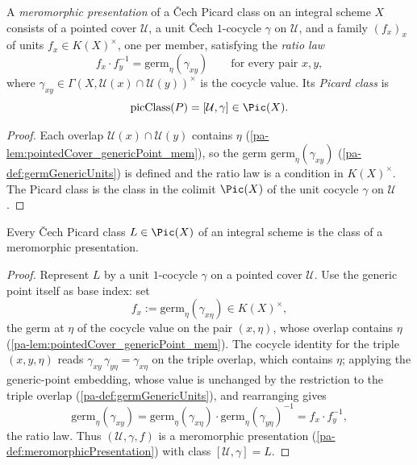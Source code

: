 \begin{definition}
  \label{pa-def:meromorphicPresentation}
  \leanok

  A \emph{meromorphic presentation} of a \v Cech Picard class on an integral scheme \(X\) consists
  of a pointed cover \(\mathcal U\), a unit \v Cech \(1\)-cocycle \(\gamma\) on \(\mathcal U\), and
  a family \((f_x)_x\) of units \(f_x \in K(X)^{\times}\), one per member, satisfying the
  \emph{ratio law}
  \[
    f_x \cdot f_y^{-1} = \mathrm{germ}_\eta(\gamma_{xy}) \qquad \text{for every pair } x, y,
  \]
  where \(\gamma_{xy} \in \Gamma(X, \mathcal U(x) \cap \mathcal U(y))^{\times}\) is the cocycle
  value. Its \emph{Picard class} is
  \[
    \mathrm{picClass}(P) = [\mathcal U, \gamma] \in \Pic(X).
  \]
\end{definition}
\begin{proof}
  \leanok
  Each overlap \(\mathcal U(x) \cap \mathcal U(y)\) contains \(\eta\)
  (\ref{pa-lem:pointedCover_genericPoint_mem}), so the germ \(\mathrm{germ}_\eta(\gamma_{xy})\)
  (\ref{pa-def:germGenericUnits}) is defined and the ratio law is a condition in \(K(X)^{\times}\).
  The Picard class is the class in the colimit \(\Pic(X)\) of the unit cocycle \(\gamma\) on
  \(\mathcal U\).
\end{proof}

\begin{theorem}
  \label{pa-thm:exists_meromorphicPresentation}
  \leanok

  Every \v Cech Picard class \(L \in \Pic(X)\) of an integral scheme is the class of a meromorphic
  presentation.
\end{theorem}
\begin{proof}
  \leanok
  Represent \(L\) by a unit \(1\)-cocycle \(\gamma\) on a pointed cover \(\mathcal U\). Use the
  generic point itself as base index: set
  \[
    f_x := \mathrm{germ}_\eta(\gamma_{x\eta}) \in K(X)^{\times},
  \]
  the germ at \(\eta\) of the cocycle value on the pair \((x, \eta)\), whose overlap contains
  \(\eta\) (\ref{pa-lem:pointedCover_genericPoint_mem}). The cocycle identity for the triple
  \((x, y, \eta)\) reads \(\gamma_{xy}\, \gamma_{y\eta} = \gamma_{x\eta}\) on the triple overlap,
  which contains \(\eta\); applying the generic-point embedding, whose value is unchanged by the
  restriction to the triple overlap (\ref{pa-def:germGenericUnits}), and rearranging gives
  \[
    \mathrm{germ}_\eta(\gamma_{xy}) = \mathrm{germ}_\eta(\gamma_{x\eta}) \cdot
      \mathrm{germ}_\eta(\gamma_{y\eta})^{-1} = f_x \cdot f_y^{-1},
  \]
  the ratio law. Thus \((\mathcal U, \gamma, f)\) is a meromorphic presentation
  (\ref{pa-def:meromorphicPresentation}) with class \([\mathcal U, \gamma] = L\).
\end{proof}

